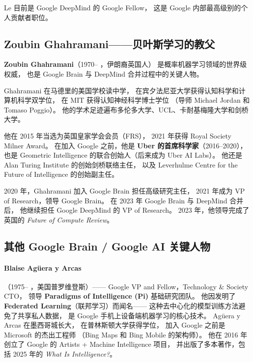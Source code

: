 Le 目前是 Google DeepMind 的 Google Fellow，
这是 Google 内部最高级别的个人贡献者职位。


\subsection{Zoubin Ghahramani——贝叶斯学习的教父}
\label{subsec:ghahramani}

\noindent\textbf{Zoubin Ghahramani}（1970-- ，伊朗裔英国人）
是概率机器学习领域的世界级权威，
也是 Google Brain 与 DeepMind 合并过程中的关键人物。

Ghahramani 在马德里的美国学校读中学，
在宾夕法尼亚大学获得认知科学和计算机科学双学位，
在 MIT 获得认知神经科学博士学位
（导师 Michael Jordan 和 Tomaso Poggio）。
他的学术足迹遍布多伦多大学、UCL、卡耐基梅隆大学和剑桥大学。

他在 2015 年当选为英国皇家学会会员（FRS），
2021 年获得 Royal Society Milner Award。
在加入 Google 之前，他是 \textbf{Uber 的首席科学家}（2016--2020），
也是 Geometric Intelligence 的联合创始人（后来成为 Uber AI Labs）。
他还是 Alan Turing Institute 的创始剑桥联络主任，
以及 Leverhulme Centre for the Future of Intelligence 的创始副主任。

2020 年，Ghahramani 加入 Google Brain 担任高级研究主任，
2021 年成为 VP of Research，领导 Google Brain。
在 2023 年 Google Brain 与 DeepMind 合并后，
他继续担任 Google DeepMind 的 VP of Research。
2023 年，他领导完成了英国的 \textit{Future of Compute Review}。


\subsection{其他 Google Brain / Google AI 关键人物}
\label{subsec:brain-others}

\paragraph{Blaise Agüera y Arcas}（1975-- ，美国普罗维登斯）——
Google VP and Fellow，Technology \& Society CTO，
领导 \textbf{Paradigms of Intelligence (Pi)} 基础研究团队。
他因发明了 \textbf{Federated Learning}（联邦学习）而闻名——
这种去中心化的模型训练方法避免了共享私人数据，
是 Google 手机上设备端机器学习的核心技术。
Agüera y Arcas 在墨西哥城长大，
在普林斯顿大学获得学位，
加入 Google 之前是 Microsoft 的杰出工程师
（Bing Maps 和 Bing Mobile 的架构师）。
他在 2016 年创立了 Google 的 Artists + Machine Intelligence 项目，
并出版了多本著作，包括 2025 年的 \textit{What Is Intelligence?}。

